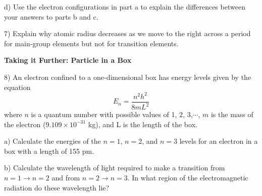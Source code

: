 \documentclass[12pt]{article}
\begin{document}
d) Use the electron configurations in part a to explain the
differences between your answers to parts b and c.
\vspace{0.5in}

7) Explain why atomic radius decreases as we move to the right
across a period for main-group elements but not for transition
elements.
\vspace{1in}

\textbf{Taking it Further: Particle in a Box}

8) An electron confined to a one-dimensional box has energy levels
given by the equation
\begin{equation}
  E_n =\frac{n^2h^2}{8mL^2}
\end{equation}
where $n$ is a quantum number with possible values of 1, 2, 3,$\cdots$, $m$
is the mass of the electron ($9.109\times 10^{-31}$ kg), and L is the length of the box.

a) Calculate the energies of the $n = 1$, $n = 2$, and $n = 3$ levels for
an electron in a box with a length of 155 pm.

b) Calculate the wavelength of light required to make a transition
from $n = 1 \rightarrow n = 2$ and from $n = 2 \rightarrow n = 3$.
In what region of the electromagnetic radiation do these wavelength lie?
\end{document}
